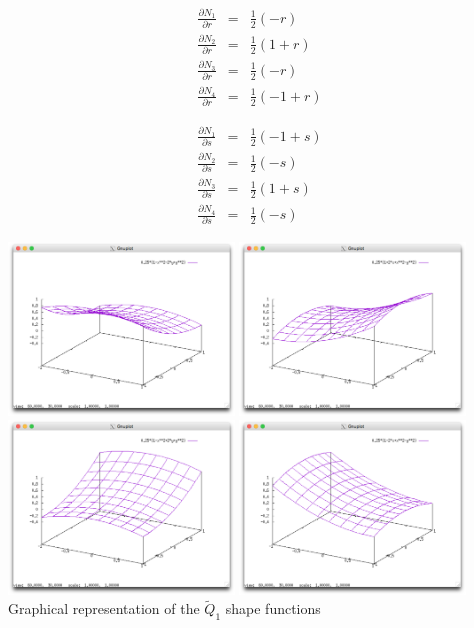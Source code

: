 \begin{eqnarray}
\frac{\partial N_1}{\partial r} &=& \frac{1}{2}(-r)\\
\frac{\partial N_2}{\partial r} &=& \frac{1}{2}(1+r)\\
\frac{\partial N_3}{\partial r} &=& \frac{1}{2}(-r)\\
\frac{\partial N_4}{\partial r} &=& \frac{1}{2}(-1+r)
\end{eqnarray}

\begin{eqnarray}
\frac{\partial N_1}{\partial s} &=& \frac{1}{2}(-1+s)\\
\frac{\partial N_2}{\partial s} &=& \frac{1}{2}(-s)\\
\frac{\partial N_3}{\partial s} &=& \frac{1}{2}(1+s)\\
\frac{\partial N_4}{\partial s} &=& \frac{1}{2}(-s)
\end{eqnarray}

\begin{center}
\includegraphics[width=6cm]{images/rannacherturek/N1}
\includegraphics[width=6cm]{images/rannacherturek/N2}\\
\includegraphics[width=6cm]{images/rannacherturek/N3}
\includegraphics[width=6cm]{images/rannacherturek/N4}\\
{\captionfont Graphical representation of the $\tilde{Q}_1$ shape functions}
\end{center}

